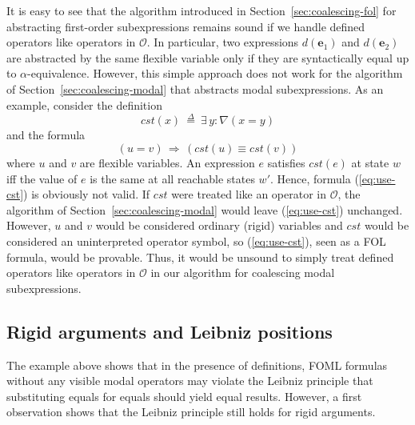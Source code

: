 \documentclass{easychair}
\renewcommand{\vec}[1]{\mathbf{#1}}
\renewcommand{\implies}{\Rightarrow}
\newcommand{\modal}{\nabla}
\newcommand{\OO}{\mathcal{O}}
\newcommand{\edmargin}[2]{\marginpar{\raggedright\footnotesize\color{red}#1: #2}}
\newcommand{\edmargin}[2]{}
\def\llmargin{\edmargin{LL}}
\def\smmargin{\edmargin{SM}}
\newcommand{\deq}{\mathrel{\stackrel{\scriptscriptstyle\Delta}{=}}}
\def\E{\exists\,}
\begin{document}
It is easy
to see that the algorithm introduced in
Section~\ref{sec:coalescing-fol} for abstracting first-order subexpressions
remains sound if we handle defined operators like operators in $\OO$.
In particular, two expressions $d(\vec{e}_1)$ and $d(\vec{e}_2)$
are abstracted by the same flexible variable only if they are syntactically
equal up to $\alpha$-equivalence.
%
However, this simple approach does not work for
the algorithm of Section~\ref{sec:coalescing-modal} that abstracts
modal subexpressions. As an example, consider the
definition
%
\begin{equation}\label{eq:def-cst}
  cst(x)\ \deq\ \E y: \modal(x=y)
\end{equation}
%
and the formula
\begin{equation}\label{eq:use-cst}
  (u=v) \,\implies\, (cst(u) \equiv cst(v))
\end{equation}
where $u$ and $v$ are flexible variables.  An expression $e$ satisfies
$cst(e)$ at state $w$ iff the value of $e$ is the same at all
reachable states $w'$.  Hence, formula (\ref{eq:use-cst}) is obviously
not valid.  If $cst$ were treated like an operator in $\OO$, the
algorithm of Section~\ref{sec:coalescing-modal} would leave
(\ref{eq:use-cst}) unchanged.  However, $u$ and $v$ would be
considered ordinary (rigid) variables and $cst$ would be considered an
uninterpreted operator symbol, so (\ref{eq:use-cst}), seen as a FOL
formula, would be
provable.  Thus, it would be unsound to simply treat defined operators
like operators in $\OO$ in our algorithm for coalescing modal
subexpressions.


\subsection{Rigid arguments and Leibniz positions}
\label{sec:leibniz-cases}

The example above shows that in the presence of definitions, FOML formulas
without any
visible modal operators may violate the Leibniz principle that
substituting equals for equals should yield equal results. However, a first
observation shows that the Leibniz principle still holds for rigid arguments.
\end{document}
